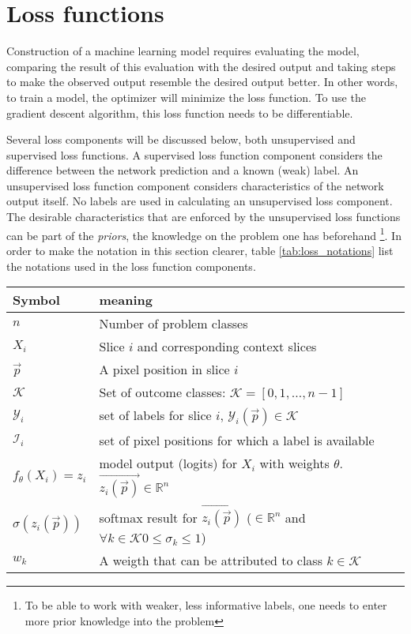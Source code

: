 
\section{Loss functions\label{sec:LossFunctions}}
\par{
    Construction of a machine learning model requires evaluating the model, comparing the result of this evaluation with the desired output and taking steps to make the observed output resemble the desired output better.
    In other words, to train a model, the optimizer will minimize the loss function.
    To use the gradient descent algorithm, this loss function needs to be differentiable.
}
\par{
    Several loss components will be discussed below, both unsupervised and supervised loss functions.
    A supervised loss function component considers the difference between the network prediction and a known (weak) label.
    An unsupervised loss function component considers characteristics of the network output itself. No labels are used in calculating an unsupervised loss component.
    The desirable characteristics that are enforced by the unsupervised loss functions can be part of the \textit{priors}, the knowledge on the problem one has beforehand
    \footnote{To be able to work with weaker, less informative labels, one needs to enter more prior knowledge into the problem}. 
}
In order to make the notation in this section clearer, table \ref{tab:loss_notations} list the notations used in the loss function components.
\begin{SCtable}[\sidecaptionrelwidth][h]
 
    \begin{tabular}{ l l } 
     \hline
     \hline
     Symbol & meaning \\
     \hline 
    $n$                 & Number of problem classes \\
    $X_i$               & Slice $i$ and corresponding context slices   \\ 
    $\vec{p}$           & A pixel position in slice $i$ \\
    $\mathcal{K}$       & Set of outcome classes: $\mathcal{K} = [0, 1, \dots, n-1]$ \\
    $\mathcal{Y}_i$     & set of labels for slice $i$, $\mathcal{Y}_i(\vec{p}) \in \mathcal{K}$  \\
    $\mathcal{I}_i$     & set of pixel positions for which a label is available \\
    $f_\theta(X_i)=z_i$ & model output (logits) for $X_i$ with weights $\theta$. $\vec{z_i(\vec{p})}\in \mathbb{R}^n$ \\
    $\sigma(z_i(\vec{p}))$   & softmax result for $\vec{z_i(\vec{p})}$ ($\in \mathbb{R}^n$ and $\forall k\in \mathcal{K} 0\leq\sigma_k\leq1$) \\
    $w_k$ & A weigth that can be attributed to class $k \in \mathcal{K}$ \\
     \hline
     \hline
    \end{tabular}
    \caption{List of symbols used in the loss functions\label{tab:loss_notations}}

\end{SCtable}
